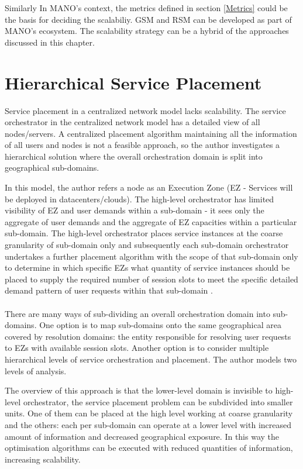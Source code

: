 Similarly In MANO's context, the metrics defined in section \ref{Metrics} could be the basis for deciding the scalabiliy. GSM and RSM can be developed as part of MANO's ecosystem. The scalability strategy can be a hybrid of the approaches discussed in this chapter.

\newpage
\section{Hierarchical Service Placement}
Service placement in a centralized network model lacks scalability. The service orchestrator in the centralized network model has a detailed view of all nodes/servers. A centralized placement algorithm maintaining all the information of all users and nodes is not a feasible approach, so the author investigates a hierarchical solution where the overall orchestration domain is split into geographical sub-domains.

In this model, the author refers a node as an Execution Zone (EZ - Services will be deployed in datacenters/clouds). The high-level orchestrator has limited visibility of EZ and user demands within a sub-domain - it sees only the aggregate of user demands and the aggregate of EZ capacities within a particular sub-domain. The high-level orchestrator places service instances at the coarse granularity of sub-domain only and subsequently each sub-domain orchestrator undertakes a further placement algorithm with the scope of that sub-domain only to determine in which specific EZs what quantity of service instances should be placed to supply the required number of session slots to meet the specific detailed demand pattern of user requests within that sub-domain \cite{maini_hierarchical_2016}.
\paragraph{}There are many ways of sub-dividing an overall orchestration domain into sub-domains. One option is to map sub-domains onto the same geographical area covered by resolution domains: the entity responsible for resolving user requests to EZs with available session slots. Another option is to consider multiple hierarchical levels of service orchestration and placement. The author models two levels of analysis.

The overview of this approach is that the lower-level domain is invisible to high-level orchestrator, the service placement problem can be subdivided into smaller units. One of them can be placed at the high level working at coarse granularity and the others: each per sub-domain can operate at a lower level with increased amount of information and decreased geographical exposure. In this way the optimisation algorithms can be executed with reduced quantities of information, increasing scalability. 
 
 
